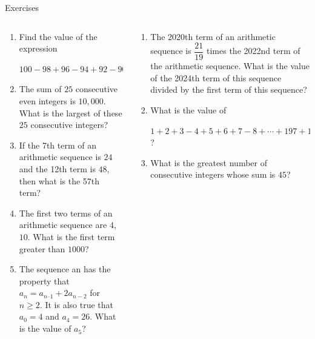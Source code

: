 \documentclass[9pt,aspectratio=169]{beamer}
\begin{document}
\begin{frame}{Exercises}
  \begin{columns}[T]
    \begin{column}{0.5\textwidth}
      \begin{enumerate}
        \item Find the value of the expression
        
        $100-98+96-94+92-90+\cdots+8-6+4-2.$ %
        \item The sum of $25$ consecutive even integers is $10,000$. What is the largest of these $25$ consecutive integers? %
        \item If the 7th term of an arithmetic sequence is $24$ and the 12th term is $48$, then what is
        the 57th term? %
        \item The first two terms of an arithmetic sequence are $4$, $10$. What is the first term greater
        than $1000$? %
        \item The sequence an has the property that $a_{n} = a_{n – 1} + 2a_{n-2}$ for $n \geq 2$. It is also
        true that $a_0 = 4$ and $a_4 = 26$. What is the value of $a_{5}$? %
        \seti
      \end{enumerate}
    \end{column}
    \begin{column}{0.5\textwidth}
      \begin{enumerate}
        \conti
        \item The 2020th term of an arithmetic sequence is $\dfrac{21}
        {19}$ times the 2022nd term of the arithmetic sequence.
        What is the value of the 2024th term of this sequence divided by the first term of this sequence? %
        \item What is the value of

        $1+2+3-4+5+6+7-8+\cdots+197+198+199-200$? %
        \item What is the greatest number of consecutive integers whose sum is $45$? %
      \end{enumerate}
    \end{column}
  \end{columns}
\end{frame}
\end{document}
